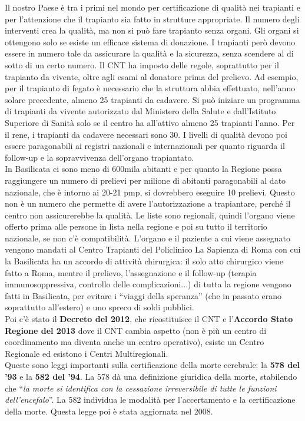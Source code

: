 Il nostro Paese è tra i primi nel mondo per certificazione di qualità
nei trapianti e per l'attenzione che il trapianto sia fatto in strutture
appropriate. Il numero degli interventi crea la qualità, ma non si può
fare trapianto senza organi. Gli organi si ottengono solo se esiste un
efficace sistema di donazione. I trapianti però devono essere in numero
tale da assicurare la qualità e la sicurezza, senza scendere al di sotto
di un certo numero. Il CNT ha imposto delle regole, soprattutto per il
trapianto da vivente, oltre agli esami al donatore prima del prelievo.
Ad esempio, per il trapianto di fegato è necessario che la struttura
abbia effettuato, nell'anno solare precedente, almeno 25 trapianti da
cadavere. Si può iniziare un programma di trapianti da vivente
autorizzato dal Ministero della Salute e dall'Istituto Superiore di
Sanità solo se il centro ha all'attivo almeno 25 trapianti l'anno. Per
il rene, i trapianti da cadavere necessari sono 30. I livelli di qualità
devono poi essere paragonabili ai registri nazionali e internazionali
per quanto riguarda il follow-up e la sopravvivenza dell'organo
trapiantato.
\\
In Basilicata ci sono meno di 600mila abitanti e per quanto la Regione
possa raggiungere un numero di prelievi per milione di abitanti
paragonabili al dato nazionale, che è intorno ai 20-21 pmp, si
dovrebbero eseguire 10 prelievi. Questo non è un numero che permette di
avere l'autorizzazione a trapiantare, perché il centro non assicurerebbe
la qualità. Le liste sono regionali, quindi l'organo viene offerto prima
alle persone in lista nella regione e poi su tutto il territorio
nazionale, se non c'è compatibilità. L'organo e il paziente a cui viene
assegnato vengono mandati al Centro Trapianti del Policlinico La
Sapienza di Roma con cui la Basilicata ha un accordo di attività
chirurgica: il solo atto chirurgico viene fatto a Roma, mentre il
prelievo, l'assegnazione e il follow-up (terapia immunosoppressiva,
controllo delle complicazioni...) di tutta la regione vengono fatti in
Basilicata, per evitare i ``viaggi della speranza'' (che in passato
erano soprattutto all'estero) e uno spreco di soldi pubblici.
\\
Poi c'è stato il \textbf{Decreto del 2012}, che ricostituisce il CNT e
l'\textbf{Accordo Stato Regione del 2013} dove il CNT cambia aspetto
(non è più un centro di coordinamento ma diventa anche un centro
operativo), esiste un Centro Regionale ed esistono i Centri
Multiregionali.
\\
Queste sono leggi importanti sulla certificazione della morte cerebrale:
la \textbf{578 del '93} e la \textbf{582 del '94}. La 578 dà una
definizione giuridica della morte, stabilendo che ``\emph{la morte si
identifica con la cessazione irreversibile di tutte le funzioni
dell'encefalo}''. La 582 individua le modalità per l'accertamento e la
certificazione della morte. Questa legge poi è stata aggiornata nel
2008.

